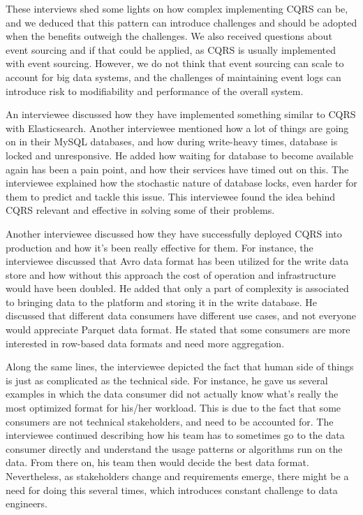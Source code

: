 \documentclass{bmcart}
\begin{document}
These interviews shed some lights on how complex implementing CQRS can be, and we deduced that this pattern can introduce challenges and should be adopted when the benefits outweigh the challenges. We also received questions about event sourcing and if that could be applied, as CQRS is usually implemented with event sourcing. However, we do not think that event sourcing can scale to account for big data systems, and the challenges of maintaining event logs can introduce risk to modifiability and performance of the overall system. 


An interviewee discussed how they have implemented something similar to CQRS with Elasticsearch. Another interviewee mentioned how a lot of things are going on in their MySQL databases, and how during write-heavy times, database is locked and unresponsive. He added how waiting for database to become available again has been a pain point, and how their services have timed out on this. The interviewee explained how the stochastic nature of database locks, even harder for them to predict and tackle this issue. This interviewee found the idea behind CQRS relevant and effective in solving some of their problems. 

Another interviewee discussed how they have successfully deployed CQRS into production and how it's been really effective for them. For instance, the interviewee discussed that Avro data format has been utilized for the write data store and how without this approach the cost of operation and infrastructure would have been doubled. He added that only a part of complexity is associated to bringing data to the platform and storing it in the write database. He discussed that different data consumers have different use cases, and not everyone would appreciate Parquet data format. He stated that some consumers are more interested in row-based data formats and need more aggregation. 

Along the same lines, the interviewee depicted the fact that human side of things is just as complicated as the technical side. For instance, he gave us several examples in which the data consumer did not actually know what's really the most optimized format for his/her workload. This is due to the fact that some consumers are not technical stakeholders, and need to be accounted for. The interviewee continued describing how his team has to sometimes go to the data consumer directly and understand the usage patterns or algorithms run on the data. From there on, his team then would decide the best data format. Nevertheless, as stakeholders change and requirements emerge, there might be a need for doing this several times, which introduces constant challenge to data engineers.
\end{document}
